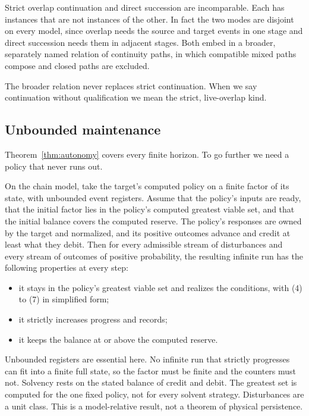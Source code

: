 \begin{proposition}
\label{prop:modes}
Strict overlap continuation and direct succession are incomparable. Each has
instances that are not instances of the other. In fact the two modes are
disjoint on every model, since overlap needs the source and target events in
one stage and direct succession needs them in adjacent stages. Both embed in a
broader, separately named relation of continuity paths, in which compatible
mixed paths compose and closed paths are excluded.
\end{proposition}

The broader relation never replaces strict continuation. When we say
continuation without qualification we mean the strict, live-overlap kind.

\subsection{Unbounded maintenance}

Theorem~\ref{thm:autonomy} covers every finite horizon. To go further we need a
policy that never runs out.

\begin{theorem}
\label{thm:unbounded}
On the chain model, take the target's computed policy on a finite factor of its
state, with unbounded event registers. Assume that the policy's inputs are
ready, that the initial factor lies in the policy's computed greatest viable
set, and that the initial balance covers the computed reserve. The policy's
responses are owned by the target and normalized, and its positive outcomes
advance and credit at least what they debit. Then for every
admissible stream of disturbances and every stream of outcomes of positive
probability, the resulting infinite run has the following properties at every
step:
\begin{itemize}
\item it stays in the policy's greatest viable set and realizes the
conditions, with (4) to (7) in simplified form;
\item it strictly increases progress and records;
\item it keeps the balance at or above the computed reserve.
\end{itemize}
\end{theorem}

Unbounded registers are essential here. No infinite run that strictly
progresses can fit into a finite full state, so the factor must be finite and
the counters must not. Solvency rests on the stated balance of credit and
debit. The greatest set is computed for the one fixed policy, not for every
solvent strategy. Disturbances are a unit class. This is a model-relative
result, not a theorem of physical persistence.

